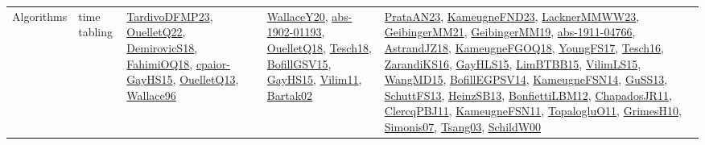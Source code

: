 {\begin{longtable}{llp{6cm}p{6cm}p{6cm}}
Algorithms & time tabling & \href{papers/TardivoDFMP23.pdf}{TardivoDFMP23}\cite{TardivoDFMP23}, \href{papers/OuelletQ22.pdf}{OuelletQ22}\cite{OuelletQ22}, \href{papers/DemirovicS18.pdf}{DemirovicS18}\cite{DemirovicS18}, \href{articles/FahimiOQ18.pdf}{FahimiOQ18}\cite{FahimiOQ18}, \href{papers/cpaior-GayHS15.pdf}{cpaior-GayHS15}\cite{cpaior-GayHS15}, \href{papers/OuelletQ13.pdf}{OuelletQ13}\cite{OuelletQ13}, \href{articles/Wallace96.pdf}{Wallace96}\cite{Wallace96} & \href{articles/WallaceY20.pdf}{WallaceY20}\cite{WallaceY20}, \href{articles/abs-1902-01193.pdf}{abs-1902-01193}\cite{abs-1902-01193}, \href{papers/OuelletQ18.pdf}{OuelletQ18}\cite{OuelletQ18}, \href{papers/Tesch18.pdf}{Tesch18}\cite{Tesch18}, \href{papers/BofillGSV15.pdf}{BofillGSV15}\cite{BofillGSV15}, \href{papers/GayHS15.pdf}{GayHS15}\cite{GayHS15}, \href{papers/Vilim11.pdf}{Vilim11}\cite{Vilim11}, \href{papers/Bartak02.pdf}{Bartak02}\cite{Bartak02} & \href{articles/PrataAN23.pdf}{PrataAN23}\cite{PrataAN23}, \href{papers/KameugneFND23.pdf}{KameugneFND23}\cite{KameugneFND23}, \href{articles/LacknerMMWW23.pdf}{LacknerMMWW23}\cite{LacknerMMWW23}, \href{papers/GeibingerMM21.pdf}{GeibingerMM21}\cite{GeibingerMM21}, \href{papers/GeibingerMM19.pdf}{GeibingerMM19}\cite{GeibingerMM19}, \href{articles/abs-1911-04766.pdf}{abs-1911-04766}\cite{abs-1911-04766}, \href{papers/AstrandJZ18.pdf}{AstrandJZ18}\cite{AstrandJZ18}, \href{papers/KameugneFGOQ18.pdf}{KameugneFGOQ18}\cite{KameugneFGOQ18}, \href{papers/YoungFS17.pdf}{YoungFS17}\cite{YoungFS17}, \href{papers/Tesch16.pdf}{Tesch16}\cite{Tesch16}, \href{articles/ZarandiKS16.pdf}{ZarandiKS16}\cite{ZarandiKS16}, \href{papers/GayHLS15.pdf}{GayHLS15}\cite{GayHLS15}, \href{papers/LimBTBB15.pdf}{LimBTBB15}\cite{LimBTBB15}, \href{papers/VilimLS15.pdf}{VilimLS15}\cite{VilimLS15}, \href{articles/WangMD15.pdf}{WangMD15}\cite{WangMD15}, \href{papers/BofillEGPSV14.pdf}{BofillEGPSV14}\cite{BofillEGPSV14}, \href{articles/KameugneFSN14.pdf}{KameugneFSN14}\cite{KameugneFSN14}, \href{papers/GuSS13.pdf}{GuSS13}\cite{GuSS13}, \href{papers/SchuttFS13.pdf}{SchuttFS13}\cite{SchuttFS13}, \href{articles/HeinzSB13.pdf}{HeinzSB13}\cite{HeinzSB13}, \href{papers/BonfiettiLBM12.pdf}{BonfiettiLBM12}\cite{BonfiettiLBM12}, \href{papers/ChapadosJR11.pdf}{ChapadosJR11}\cite{ChapadosJR11}, \href{papers/ClercqPBJ11.pdf}{ClercqPBJ11}\cite{ClercqPBJ11}, \href{papers/KameugneFSN11.pdf}{KameugneFSN11}\cite{KameugneFSN11}, \href{articles/TopalogluO11.pdf}{TopalogluO11}\cite{TopalogluO11}, \href{papers/GrimesH10.pdf}{GrimesH10}\cite{GrimesH10}, \href{articles/Simonis07.pdf}{Simonis07}\cite{Simonis07}, \href{articles/Tsang03.pdf}{Tsang03}\cite{Tsang03}, \href{articles/SchildW00.pdf}{SchildW00}\cite{SchildW00}\\
\end{longtable}
}

